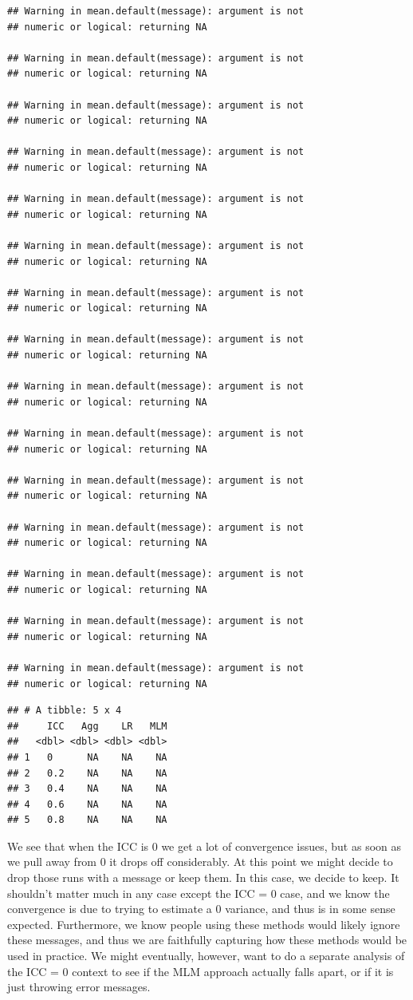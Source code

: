 \documentclass[
]{book}
\begin{document}
\begin{verbatim}
## Warning in mean.default(message): argument is not
## numeric or logical: returning NA

## Warning in mean.default(message): argument is not
## numeric or logical: returning NA

## Warning in mean.default(message): argument is not
## numeric or logical: returning NA

## Warning in mean.default(message): argument is not
## numeric or logical: returning NA

## Warning in mean.default(message): argument is not
## numeric or logical: returning NA

## Warning in mean.default(message): argument is not
## numeric or logical: returning NA

## Warning in mean.default(message): argument is not
## numeric or logical: returning NA

## Warning in mean.default(message): argument is not
## numeric or logical: returning NA

## Warning in mean.default(message): argument is not
## numeric or logical: returning NA

## Warning in mean.default(message): argument is not
## numeric or logical: returning NA

## Warning in mean.default(message): argument is not
## numeric or logical: returning NA

## Warning in mean.default(message): argument is not
## numeric or logical: returning NA

## Warning in mean.default(message): argument is not
## numeric or logical: returning NA

## Warning in mean.default(message): argument is not
## numeric or logical: returning NA

## Warning in mean.default(message): argument is not
## numeric or logical: returning NA
\end{verbatim}

\begin{verbatim}
## # A tibble: 5 x 4
##     ICC   Agg    LR   MLM
##   <dbl> <dbl> <dbl> <dbl>
## 1   0      NA    NA    NA
## 2   0.2    NA    NA    NA
## 3   0.4    NA    NA    NA
## 4   0.6    NA    NA    NA
## 5   0.8    NA    NA    NA
\end{verbatim}

We see that when the ICC is 0 we get a lot of convergence issues, but as soon as we pull away from 0 it drops off considerably.
At this point we might decide to drop those runs with a message or keep them.
In this case, we decide to keep.
It shouldn't matter much in any case except the ICC = 0 case, and we know the convergence is due to trying to estimate a 0 variance, and thus is in some sense expected.
Furthermore, we know people using these methods would likely ignore these messages, and thus we are faithfully capturing how these methods would be used in practice.
We might eventually, however, want to do a separate analysis of the ICC = 0 context to see if the MLM approach actually falls apart, or if it is just throwing error messages.
\end{document}
